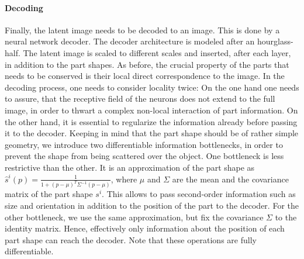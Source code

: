 \paragraph{Decoding}
Finally, the latent image needs to be decoded to an image. This is done by a neural network decoder. The decoder architecture is modeled after an hourglass-half. The latent image is scaled to different scales and inserted, after each layer, in addition to the part shapes. As before, the crucial property of the parts that needs to be conserved is their local direct correspondence to the image. In the decoding process, one needs to consider locality twice: On the one hand one needs to assure, that the receptive field of the neurons does not extend to the full image, in order to thwart a complex non-local interaction of part information.
On the other hand, it is essential to regularize the information already before passing it to the decoder. Keeping in mind that the part shape should be of rather simple geometry, we introduce two differentiable information bottlenecks, in order to prevent the shape from being scattered over the object.
One bottleneck is less restrictive than the other. It is an approximation of the part shape as $\hat s^i(p) = \frac{1}{1 + (p -\mu)^T \Sigma^{-1} (p - \mu)}$, where $\mu$ and $\Sigma$ are the mean and the covariance matrix of the part shape $s^i$. This allows to pass second-order information such as size and orientation in addition to the position of the part to the decoder.
For the other bottleneck, we use the same approximation, but fix the covariance $\Sigma$ to the identity matrix. Hence, effectively only information about the position of each part shape can reach the decoder. Note that these operations are fully differentiable.

